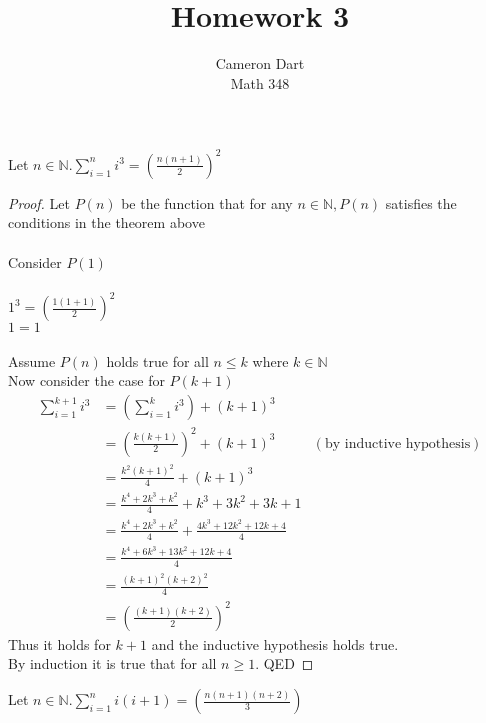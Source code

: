 \documentclass[12pt]{article}
\newcommand{\N}{\mathbb{N}}
\newenvironment{theorem}[2][Theorem]{\begin{trivlist}
\item[\hskip \labelsep {\bfseries #1}\hskip \labelsep {\bfseries #2.}]}{\end{trivlist}}
\begin{document}
  
\title{Homework 3}
\author{Cameron Dart\\ 
Math 348} 
 
\maketitle
 
\begin{theorem}{3.16}
Let $n\in \N. \sum_{i=1}^{n}i^3 = (\frac{n(n+1)}{2})^2$
\end{theorem}
\begin{proof}
Let $P(n)$ be the function that for any $n\in \N, P(n) $ satisfies the conditions in the theorem above \\ \\
Consider $P(1)$\\ \\
$1^3 = (\frac{1(1+1)}{2})^2$\\
$1 = 1$\\ \\
Assume $P(n)$ holds true for all $n \leq k$ where $k \in \N $\\
Now consider the case for $P(k+1)$ \\
\begin{align*}
\sum_{i=1}^{k+1}i^3 & = \left(\sum_{i=1}^{k}i^3\right)+(k+1)^3\\ 
& = \left(\frac{k(k+1)}{2}\right)^2+(k+1)^3 & (\text{by inductive hypothesis})\\
& = \frac{k^2(k+1)^2}{4}+(k+1)^3 \\
& = \frac{k^4+2k^3+k^2}{4} + k^3+3k^2+3k+1 \\
& = \frac{k^4+2k^3+k^2}{4} + \frac{4k^3+12k^2+12k+4}{4} \\
& = \frac{k^4+6k^3+13k^2+12k+4}{4} \\
& = \frac{(k+1)^2(k+2)^2}{4} \\
& = \left(\frac{(k+1)(k+2)}{2}\right)^2
\end{align*}
Thus it holds for $k+1$ and the inductive hypothesis holds true.\\
By induction it is true that for all $n \geq 1$. QED
\end{proof} 
\begin{theorem}{3.17}
Let $n\in \N. \sum_{i=1}^{n}i(i+1) = (\frac{n(n+1)(n+2)}{3})$
\end{theorem}
\end{document}
